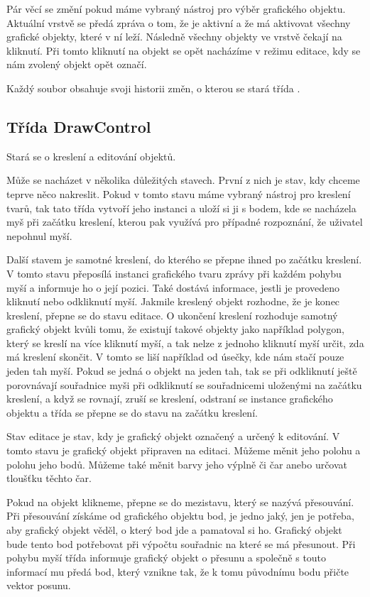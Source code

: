 \documentclass[
  field=inf,
  biblatex,
  glossaries,
  index
]{kidiplom}
\begin{document}
Pár věcí se změní pokud máme vybraný nástroj pro výběr grafického objektu. Aktuální vrstvě se předá zpráva o tom, že je aktivní a že má aktivovat všechny grafické objekty, které v ní leží. Následně všechny objekty ve vrstvě čekají na kliknutí. Při tomto kliknutí na objekt se opět nacházíme v režimu editace, kdy se nám zvolený objekt opět označí.

Každý soubor obsahuje svoji historii změn, o kterou se stará třída .

\subsection{Třída DrawControl}

Stará se o kreslení a editování objektů.

Může se nacházet v několika důležitých stavech. První z nich je stav, kdy chceme teprve něco nakreslit. Pokud v tomto stavu máme vybraný nástroj pro kreslení tvarů, tak tato třída vytvoří jeho instanci a uloží si ji s bodem, kde se nacházela myš při začátku kreslení, kterou pak využívá pro případné rozpoznání, že uživatel nepohnul myší. 

Další stavem je samotné kreslení, do kterého se přepne ihned po začátku kreslení. V tomto stavu přeposílá instanci grafického tvaru zprávy při každém pohybu myší a informuje ho o její pozici. Také dostává informace, jestli je provedeno kliknutí nebo odkliknutí myší. Jakmile kreslený objekt rozhodne, že je konec kreslení, přepne se  do stavu editace. O ukončení kreslení rozhoduje samotný grafický objekt kvůli tomu, že existují takové objekty jako například polygon, který se kreslí na více kliknutí myší, a tak nelze z jednoho kliknutí myší určit, zda má kreslení skončit. V tomto se liší například od úsečky, kde nám stačí pouze jeden tah myší. Pokud se jedná o objekt na jeden tah, tak se při odkliknutí ještě porovnávají souřadnice myši při odkliknutí se souřadnicemi uloženými na začátku kreslení, a když se rovnají, zruší se kreslení, odstraní se instance grafického objektu a třída  se přepne se do stavu na začátku kreslení.

Stav editace je stav, kdy je grafický objekt označený a určený k editování. V tomto stavu je grafický objekt připraven na editaci. Můžeme měnit jeho polohu a polohu jeho bodů. Můžeme také měnit barvy jeho výplně či čar anebo určovat tloušťku těchto čar.

Pokud na objekt klikneme, přepne se do mezistavu, který se nazývá přesouvání. Při přesouvání získáme od grafického objektu bod, je jedno jaký, jen je potřeba, aby grafický objekt věděl, o který bod jde a pamatoval si ho. Grafický objekt bude tento bod potřebovat při výpočtu souřadnic na které se má přesunout. Při pohybu myší třída  informuje grafický objekt o přesunu a společně s touto informací mu předá bod, který vznikne tak, že k tomu původnímu bodu přičte vektor posunu.
\end{document}
